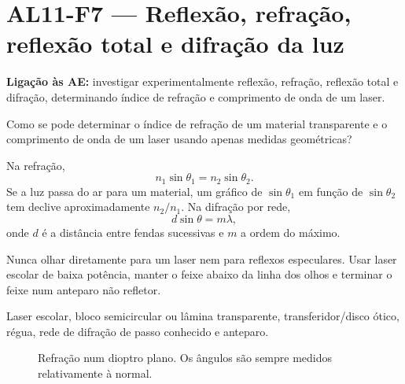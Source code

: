 \documentclass[11pt,a4paper,openany]{book}
\newcommand{\LigAE}[1]{\textbf{Ligação às AE:} #1}
\begin{document}
\section{AL11-F7 — Reflexão, refração, reflexão total e difração da luz}
\LigAE{investigar experimentalmente reflexão, refração, reflexão total e difração, determinando índice de refração e comprimento de onda de um laser.}

\begin{questao}
Como se pode determinar o índice de refração de um material transparente e o comprimento de onda de um laser usando apenas medidas geométricas?
\end{questao}

\begin{fundamento}
Na refração,
\[
n_1\sin\theta_1=n_2\sin\theta_2.
\]
Se a luz passa do ar para um material, um gráfico de $\sin\theta_1$ em função de $\sin\theta_2$ tem declive aproximadamente $n_2/n_1$. Na difração por rede,
\[
d\sin\theta=m\lambda,
\]
onde $d$ é a distância entre fendas sucessivas e $m$ a ordem do máximo.
\end{fundamento}

\begin{seguranca}
Nunca olhar diretamente para um laser nem para reflexos especulares. Usar laser escolar de baixa potência, manter o feixe abaixo da linha dos olhos e terminar o feixe num anteparo não refletor.
\end{seguranca}

\begin{material}
Laser escolar, bloco semicircular ou lâmina transparente, transferidor/disco ótico, régua, rede de difração de passo conhecido e anteparo.
\end{material}

\begin{figure}[H]
\centering
{}
\caption{Refração num dioptro plano. Os ângulos são sempre medidos relativamente à normal.}
\end{figure}
\end{document}
